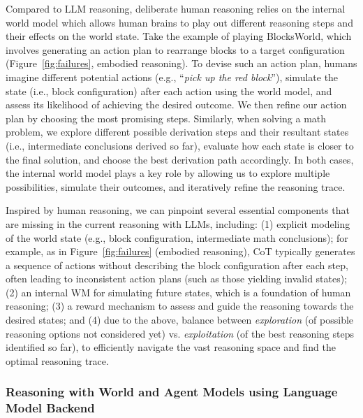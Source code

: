\documentclass{article}
\begin{document}
Compared to LLM reasoning, deliberate human reasoning relies on the internal world model which allows human brains to play out different reasoning steps and their effects on the world state. Take the example of playing BlocksWorld, which involves generating an action plan to rearrange blocks to a target configuration (Figure~\ref{fig:failures}, embodied reasoning). To devise such an action plan, humans imagine different potential actions (e.g., ``{\it pick up the red block}''), simulate the state (i.e., block configuration) after each action using the world model, and assess its likelihood of achieving the desired outcome. We then refine our action plan by choosing the most promising steps. Similarly, when solving a math problem, we explore different possible derivation steps and their resultant states (i.e., intermediate conclusions derived so far), evaluate how each state is closer to the final solution, and choose the best derivation path accordingly. In both cases, the internal world model plays a key role by allowing us to explore multiple possibilities, simulate their outcomes, and iteratively refine the reasoning trace.

Inspired by human reasoning, we can pinpoint several essential components that are missing in the current reasoning with LLMs, including:
(1) explicit modeling of the world state (e.g., block configuration, intermediate math conclusions); for example, as in Figure~\ref{fig:failures} (embodied reasoning), CoT typically generates a sequence of actions without describing the block configuration after each step, often leading to inconsistent action plans (such as those yielding invalid states); 
(2) an internal WM for simulating future states, which is a foundation of human reasoning; 
(3) a reward mechanism to assess and guide the reasoning towards the desired states; 
and (4) due to the above, balance between {\it exploration} (of possible reasoning options not considered yet) vs. {\it exploitation} (of the best reasoning steps identified so far), to efficiently navigate the vast reasoning space and find the optimal reasoning trace.

\subsubsection{Reasoning with World and Agent Models using Language Model Backend}
\end{document}
